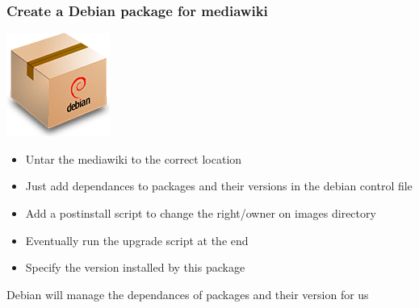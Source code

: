 \documentclass[11pt,compress]{beamer}
\begin{document}
\begin{frame}
\frametitle{Create a Debian package for mediawiki}
\begin{center}
\includegraphics[scale=0.3]{figures/deb_package}
\end{center}
\begin{itemize}
\item Untar the mediawiki to the correct location
\item Just add dependances to packages and their versions in the debian control file
\item Add a postinstall script to change the right/owner on images directory
\item Eventually run the upgrade script at the end
\item Specify the version installed by this package
\end{itemize}
\begin{block}{}
Debian will manage the dependances of packages and their version for us
\end{block}
\end{frame}
\end{document}
